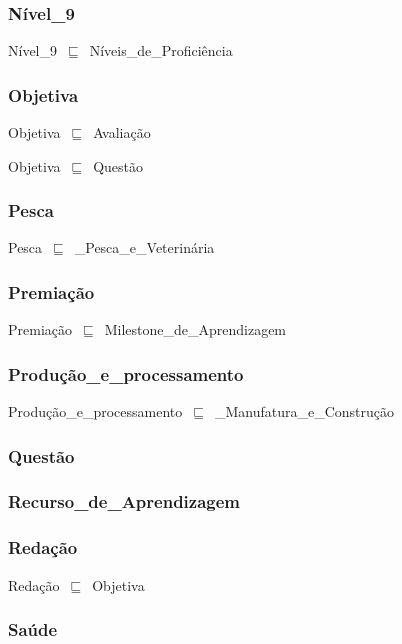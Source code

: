 \documentclass{article}
\begin{document}
\subsubsection*{Nível\_9}

Nível\_9~\ensuremath{\sqsubseteq}~Níveis\_de\_Proficiência~

\subsubsection*{Objetiva}

Objetiva~\ensuremath{\sqsubseteq}~Avaliação~

Objetiva~\ensuremath{\sqsubseteq}~Questão~

\subsubsection*{Pesca}

Pesca~\ensuremath{\sqsubseteq}~\_Pesca\_e\_Veterinária~

\subsubsection*{Premiação}

Premiação~\ensuremath{\sqsubseteq}~Milestone\_de\_Aprendizagem~

\subsubsection*{Produção\_e\_processamento}

Produção\_e\_processamento~\ensuremath{\sqsubseteq}~\_Manufatura\_e\_Construção~

\subsubsection*{Questão}

\subsubsection*{Recurso\_de\_Aprendizagem}

\subsubsection*{Redação}

Redação~\ensuremath{\sqsubseteq}~Objetiva~

\subsubsection*{Saúde}
\end{document}
